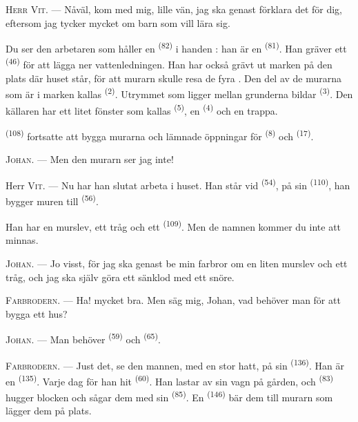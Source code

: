 \VUsaut{3.0mm}

\textsc{Herr Vit}. --- Nåväl, kom med mig, lille vän, jag ska genast förklara det för dig,
eftersom jag tycker mycket om barn som vill lära sig.

Du ser den arbetaren som håller en  \textsuperscript{(82)} i handen : han är en
 \textsuperscript{(81)}. Han gräver ett
 \textsuperscript{(46)} för att lägga ner vattenledningen. Han har
också grävt ut marken på den plats där huset står, för att murarn skulle resa de fyra
. Den del av de murarna som är i marken kallas
 \textsuperscript{(2)}. Utrymmet som ligger mellan grunderna
bildar  \textsuperscript{(3)}. Den källaren har ett litet fönster som kallas
 \textsuperscript{(5)}, en
 \textsuperscript{(4)} och en trappa.

 \textsuperscript{(108)} fortsatte att bygga murarna och lämnade
öppningar för  \textsuperscript{(8)} och 
\textsuperscript{(17)}.

\textsc{Johan}. --- Men den murarn ser jag inte!

Herr \textsc{Vit}. --- Nu har han slutat arbeta i huset. Han står vid
 \textsuperscript{(54)}, på sin 
\textsuperscript{(110)}, han bygger muren till  \textsuperscript{(56)}.

Han har en murslev, ett tråg och ett  \textsuperscript{(109)}. Men de namnen
kommer du inte att minnas.

\textsc{Johan}. --- Jo visst, för jag ska genast be min farbror om en liten murslev och ett
tråg, och jag ska själv göra ett sänklod med ett snöre.

\VUsaut{3.0mm}
\VUsaut{3.0mm}

\textsc{Farbrodern}. --- Ha! mycket bra. Men säg mig, Johan, vad behöver man för att bygga ett
hus?

\textsc{Johan}. --- Man behöver  \textsuperscript{(59)} och
 \textsuperscript{(65)}.

\textsc{Farbrodern}. --- Just det, se den mannen, med en stor hatt, på sin
 \textsuperscript{(136)}. Han är en 
\textsuperscript{(135)}. Varje dag för han hit  \textsuperscript{(60)}. Han
lastar av sin vagn på gården, och
 \textsuperscript{(83)} hugger blocken och sågar dem med
sin  \textsuperscript{(85)}. En  \textsuperscript{(146)}
bär dem till murarn som lägger dem på plats.

